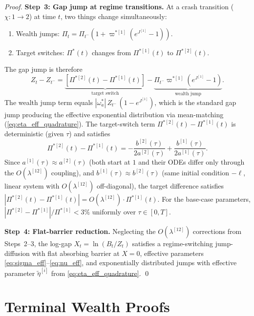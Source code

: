 \documentclass[11pt,a4paper]{article}
\numberwithin{equation}{section}
\begin{document}
\begin{appendices}
\begin{proof}
\medskip\noindent\textbf{Step~3: Gap jump at regime transitions.}
At a crash transition ($\chi: 1 \to 2$) at time $t$, two things change simultaneously:
\begin{enumerate}[label=(\alph*)]
\item Wealth jumps: $\Pi_t = \Pi_{t^-}(1 + \varpi^{*[1]}(e^{J^{[1]}} - 1))$.
\item Target switches: $\Pi^*(t)$ changes from $\Pi^{*[1]}(t)$ to $\Pi^{*[2]}(t)$.
\end{enumerate}
The gap jump is therefore
\begin{equation}\label{eq:gap_jump_full}
Z_t - Z_{t^-} = \underbrace{[\Pi^{*[2]}(t) - \Pi^{*[1]}(t)]}_{\text{target switch}} - \underbrace{\Pi_{t^-}\varpi^{*[1]}(e^{J^{[1]}} - 1)}_{\text{wealth jump}}.
\end{equation}
The wealth jump term equals $|\omega^*_a|\,Z_{t^-}\,(1 - e^{J^{[1]}})$, which is the standard gap jump producing the effective exponential distribution via mean-matching (\eqref{eq:eta_eff_quadrature}).  The target-switch term $\Pi^{*[2]}(t) - \Pi^{*[1]}(t)$ is deterministic (given $\tau$) and satisfies
\begin{equation}\label{eq:target_diff}
\Pi^{*[2]}(t) - \Pi^{*[1]}(t) = -\frac{b^{[2]}(\tau)}{2a^{[2]}(\tau)} + \frac{b^{[1]}(\tau)}{2a^{[1]}(\tau)}.
\end{equation}
Since $a^{[1]}(\tau) \approx a^{[2]}(\tau)$ (both start at $1$ and their ODEs differ only through the $O(\lambda^{[12]})$ coupling), and $b^{[1]}(\tau) \approx b^{[2]}(\tau)$ (same initial condition $-\ell$, linear system with $O(\lambda^{[12]})$ off-diagonal), the target difference satisfies $|\Pi^{*[2]}(t) - \Pi^{*[1]}(t)| = O(\lambda^{[12]}) \cdot \Pi^{*[1]}(t)$.  For the base-case parameters, $|\Pi^{*[2]} - \Pi^{*[1]}|/\Pi^{*[1]} < 3\%$ uniformly over $\tau \in [0, T]$.

\medskip\noindent\textbf{Step~4: Flat-barrier reduction.}
Neglecting the $O(\lambda^{[12]})$ corrections from Steps~2--3, the log-gap $X_t = \ln(B_t/Z_t)$ satisfies a regime-switching jump-diffusion with flat absorbing barrier at $X = 0$, effective parameters \eqref{eq:sigma_eff}--\eqref{eq:nu_eff}, and exponentially distributed jumps with effective parameter $\tilde\eta^{[i]}$ from \eqref{eq:eta_eff_quadrature}.
\qed
\end{proof}


\section{Terminal Wealth Proofs}\label{app:terminal_proofs}


\end{appendices}
\end{document}
